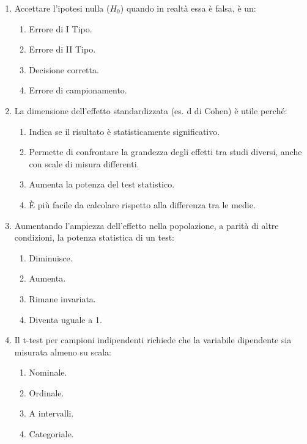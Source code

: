 \documentclass[12pt, a4paper]{article}
\begin{document}
\begin{enumerate}[resume]
    \item Accettare l'ipotesi nulla ($H_0$) quando in realtà essa è falsa, è un:
    \begin{enumerate}
        \item Errore di I Tipo.
        \item Errore di II Tipo.
        \item Decisione corretta.
        \item Errore di campionamento.
    \end{enumerate}
    \vspace{0.3cm}

    \item La dimensione dell'effetto standardizzata (es. d di Cohen) è utile perché:
    \begin{enumerate}
        \item Indica se il risultato è statisticamente significativo.
        \item Permette di confrontare la grandezza degli effetti tra studi diversi, anche con scale di misura differenti.
        \item Aumenta la potenza del test statistico.
        \item È più facile da calcolare rispetto alla differenza tra le medie.
    \end{enumerate}
    \vspace{0.3cm}

    \item Aumentando l'ampiezza dell'effetto nella popolazione, a parità di altre condizioni, la potenza statistica di un test:
    \begin{enumerate}
        \item Diminuisce.
        \item Aumenta.
        \item Rimane invariata.
        \item Diventa uguale a 1.
    \end{enumerate}
    \vspace{0.3cm}

    \item Il t-test per campioni indipendenti richiede che la variabile dipendente sia misurata almeno su scala:
    \begin{enumerate}
        \item Nominale.
        \item Ordinale.
        \item A intervalli.
        \item Categoriale.
    \end{enumerate}
    \vspace{0.3cm}


\end{enumerate}
\end{document}

